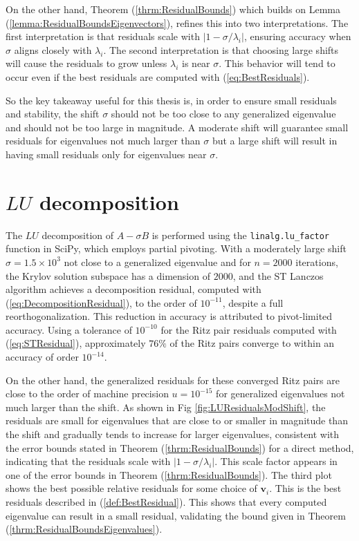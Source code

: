 On the other hand, Theorem (\ref{thrm:ResidualBounds}) which builds on Lemma (\ref{lemma:ResidualBoundsEigenvectors}), refines this into two interpretations. The first interpretation is that residuals scale with $\lvert 1 - \sigma/ \lambda_i \rvert$, ensuring accuracy when $\sigma$ aligns closely with $\lambda_i$. The second interpretation is that choosing large shifts will cause the residuals to grow unless $\lambda_i$ is near $\sigma$. This behavior will tend to occur even if the best residuals are computed with (\ref{eq:BestResiduals}).

So the key takeaway useful for this thesis is, in order to ensure small residuals and stability, the shift $\sigma$ should not be too close to any generalized eigenvalue and should not be too large in magnitude. A moderate shift will guarantee small residuals for eigenvalues not much larger than $\sigma$ but a large shift will result in having small residuals only for eigenvalues near $\sigma$.

\section{$LU$ decomposition}

The $LU$ decomposition of $A - \sigma B$ is performed using the \texttt{linalg.lu\_factor} function in SciPy, which employs partial pivoting. With a moderately large shift $\sigma = 1.5 \times 10^3$ not close to a generalized eigenvalue and for $n = 2000$ iterations, the Krylov solution subspace has a dimension of $2000$, and the ST Lanczos algorithm achieves a decomposition residual, computed with (\ref{eq:DecompositionResidual}), to the order of $10^{-11}$, despite a full reorthogonalization. This reduction in accuracy is attributed to pivot-limited accuracy. Using a tolerance of $10^{-10}$ for the Ritz pair residuals computed with (\ref{eq:STResidual}), approximately $76\%$ of the Ritz pairs converge to within an accuracy of order $10^{-14}$.

On the other hand, the generalized residuals for these converged Ritz pairs are close to the order of machine precision $u=10^{-15}$ for generalized eigenvalues not much larger than the shift. As shown in Fig \ref{fig:LUResidualsModShift}, the residuals are small for eigenvalues that are close to or smaller in magnitude than the shift and gradually tends to increase for larger eigenvalues, consistent with the error bounds stated in Theorem (\ref{thrm:ResidualBounds}) for a direct method, indicating that the residuals scale with $\lvert 1-\sigma/\lambda_i \rvert$. This scale factor appears in one of the error bounds in Theorem (\ref{thrm:ResidualBounds}). The third plot shows the best possible relative residuals for some choice of $\mathbf{v}_i$. This is the best residuals described in (\ref{def:BestResidual}). This shows that every computed eigenvalue can result in a small residual, validating the bound given in Theorem (\ref{thrm:ResidualBoundsEigenvalues}).

